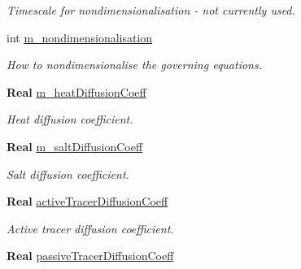 \begin{DoxyCompactItemize}
\begin{DoxyCompactList}\small\item\em Timescale for nondimensionalisation -\/ not currently used. \end{DoxyCompactList}\item 
\mbox{\label{class_mushy_layer_params_aa9567ee5806f9aa8619a760da3574ba4}} 
int \hyperlink{class_mushy_layer_params_aa9567ee5806f9aa8619a760da3574ba4}{m\+\_\+nondimensionalisation}
\begin{DoxyCompactList}\small\item\em How to nondimensionalise the governing equations. \end{DoxyCompactList}\item 
\mbox{\label{class_mushy_layer_params_a6c0e412490392930b9e23bc271fa6538}} 
\textbf{ Real} \hyperlink{class_mushy_layer_params_a6c0e412490392930b9e23bc271fa6538}{m\+\_\+heat\+Diffusion\+Coeff}
\begin{DoxyCompactList}\small\item\em Heat diffusion coefficient. \end{DoxyCompactList}\item 
\mbox{\label{class_mushy_layer_params_a797b35fc1db221bff72743474c7a89a8}} 
\textbf{ Real} \hyperlink{class_mushy_layer_params_a797b35fc1db221bff72743474c7a89a8}{m\+\_\+salt\+Diffusion\+Coeff}
\begin{DoxyCompactList}\small\item\em Salt diffusion coefficient. \end{DoxyCompactList}\item 
\mbox{\label{class_mushy_layer_params_a06f6b389e587cfa4b24b40b02db73a87}} 
\textbf{ Real} \hyperlink{class_mushy_layer_params_a06f6b389e587cfa4b24b40b02db73a87}{active\+Tracer\+Diffusion\+Coeff}
\begin{DoxyCompactList}\small\item\em Active tracer diffusion coefficient. \end{DoxyCompactList}\item 
\mbox{\label{class_mushy_layer_params_a0d32262edb5a40d40c084ef8d55579a4}} 
\textbf{ Real} \hyperlink{class_mushy_layer_params_a0d32262edb5a40d40c084ef8d55579a4}{passive\+Tracer\+Diffusion\+Coeff}

\end{DoxyCompactItemize}
